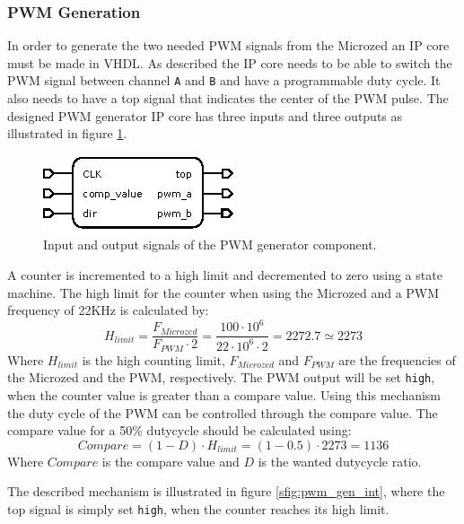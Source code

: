 \subsubsection{PWM Generation} %
\label{ssub:pwm_generation}
In order to generate the two needed PWM signals from the Microzed an IP core must be made in VHDL.
As described the IP core needs to be able to switch the PWM signal between channel \texttt{A} and \texttt{B} and have a programmable duty cycle.
It also needs to have a top signal that indicates the center of the PWM pulse.
The designed PWM generator IP core has three inputs and three outputs as illustrated in figure \ref{fig:pwm_gen_component}.
\begin{figure}[h]
	\centering
	\includegraphics[width=.4\linewidth]{graphics/pwm_generator}
	\caption{Input and output signals of the PWM generator component.}
	\label{fig:pwm_gen_component}
\end{figure}
A counter is incremented to a high limit and decremented to zero using a state machine.
The high limit for the counter when using the Microzed and a PWM frequency of 22KHz is calculated by:
\begin{equation}
	H_{limit} = \frac{F_{Microzed}}{F_{PWM}\cdot 2} = \frac{100\cdot 10^6}{22\cdot 10^6 \cdot 2} = 2272.7 \simeq 2273
\end{equation}
Where $H_{limit}$ is the high counting limit, $F_{Microzed}$ and $F_{PWM}$ are the frequencies of the Microzed and the PWM, respectively. 
The PWM output will be set \texttt{high}, when the counter value is greater than a compare value.
Using this mechanism the duty cycle of the PWM can be controlled through the compare value.
The compare value for a 50\% dutycycle should be calculated using:
\begin{equation}
	Compare = (1 - D) \cdot H_{limit} = (1 - 0.5) \cdot 2273 = 1136
\end{equation}
Where $Compare$ is the compare value and $D$ is the wanted dutycycle ratio.

The described mechanism is illustrated in figure \ref{sfig:pwm_gen_int}, where the top signal is simply set \texttt{high}, when the counter reaches its high limit.

